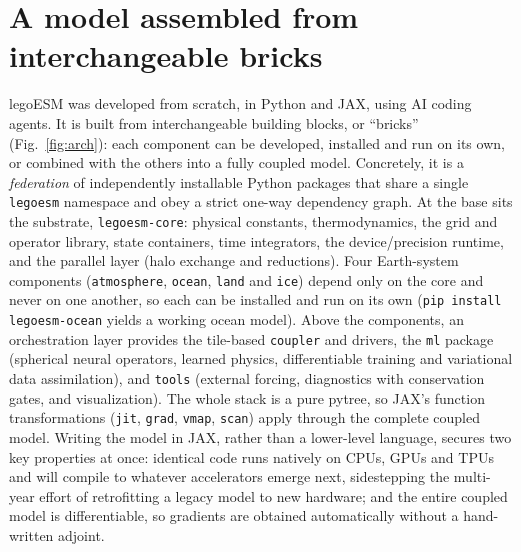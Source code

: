\documentclass[11pt]{article}
\begin{document}
\section*{A model assembled from interchangeable bricks}
legoESM was developed from scratch, in Python and JAX, using AI coding agents. It is built from
interchangeable building blocks, or ``bricks'' (Fig.~\ref{fig:arch}): each component can be
developed, installed and run on its own, or combined with the others into a fully coupled model.
Concretely, it is a \emph{federation} of independently installable Python packages that share a
single \texttt{legoesm} namespace and obey a strict one-way dependency graph. At the base sits the substrate, \texttt{legoesm-core}: physical
constants, thermodynamics, the grid and operator library, state containers, time integrators,
the device/precision runtime, and the parallel layer (halo exchange and reductions). Four
Earth-system components (\texttt{atmosphere}, \texttt{ocean}, \texttt{land} and
\texttt{ice}) depend only on the core and never on one another, so each can be installed and
run on its own (\texttt{pip install legoesm-ocean} yields a working ocean model). Above the
components, an orchestration layer provides the tile-based \texttt{coupler} and drivers, the
\texttt{ml} package (spherical neural operators, learned physics, differentiable training and
variational data assimilation), and \texttt{tools} (external forcing, diagnostics with
conservation gates, and visualization). The whole stack is a pure pytree, so JAX's function
transformations (\texttt{jit}, \texttt{grad}, \texttt{vmap}, \texttt{scan}) apply through the
complete coupled model. Writing the model in JAX, rather than a lower-level language, secures two
key properties at once: identical code runs natively on CPUs, GPUs and TPUs and will compile to
whatever accelerators emerge next, sidestepping the multi-year effort of retrofitting a legacy
model to new hardware; and the entire coupled model is differentiable, so gradients are obtained
automatically without a hand-written adjoint.
\end{document}
